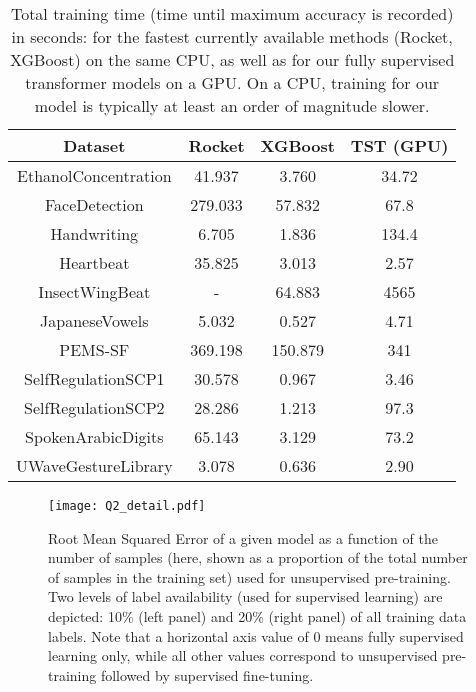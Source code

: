 \documentclass{article} \usepackage{iclr2021_conference,times}
\begin{document}
\begin{table}
\centering
\begin{tabular}{|c|c|c|c|} 
\hline
 \textbf{Dataset}    & \textbf{Rocket}  & \textbf{XGBoost}  & \textbf{TST (GPU)}  \\ 
\hline
EthanolConcentration & 41.937           & 3.760             & 34.72               \\
FaceDetection        & 279.033          & 57.832            & 67.8                \\
Handwriting          & 6.705            & 1.836             & 134.4               \\
Heartbeat            & 35.825           & 3.013             & 2.57                \\
InsectWingBeat       & -                & 64.883            & 4565                \\
JapaneseVowels       & 5.032            & 0.527             & 4.71                \\
PEMS-SF              & 369.198          & 150.879           & 341                 \\
SelfRegulationSCP1   & 30.578           & 0.967             & 3.46                \\
SelfRegulationSCP2   & 28.286           & 1.213             & 97.3                \\
SpokenArabicDigits   & 65.143           & 3.129             & 73.2                \\
UWaveGestureLibrary  & 3.078            & 0.636             & 2.90                \\
\hline
\end{tabular}
\caption{Total training time (time until maximum accuracy is recorded) in seconds: for the fastest currently available methods (Rocket, XGBoost) on the same CPU, as well as for our fully supervised transformer models on a GPU. On a CPU, training for our model is typically at least an order of magnitude slower.}
\label{tab:timing}
\end{table}

\begin{figure}[h]
    \centering
    \texttt{[image: Q2\_detail.pdf]}
    \caption{Root Mean Squared Error of a given model as a function of the number of samples (here, shown as a proportion of the total number of samples in the training set) used for unsupervised pre-training. Two levels of label availability (used for supervised learning) are depicted: 10\% (left panel) and 20\% (right panel) of all training data labels. Note that a horizontal axis value of 0 means fully supervised learning only, while all other values correspond to unsupervised pre-training followed by supervised fine-tuning.}
    \label{fig:Q2_detail}
\end{figure}
\end{document}
